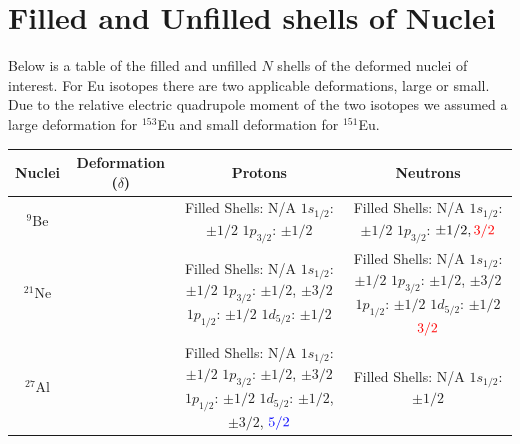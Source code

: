 \documentclass[8pt,a4paper, twoside]{report}
\begin{document}
\section{Filled and Unfilled shells of Nuclei}
Below is a table of the filled and unfilled $N$ shells of the deformed nuclei of interest. For Eu isotopes there are two applicable deformations, large or small. Due to the relative electric quadrupole moment of the two isotopes we assumed a large deformation for $^{153}$Eu and small deformation for $^{151}$Eu.
\begin{table}[htbp]
\begin{adjustwidth}{-3cm}{-3cm}
\center
\begin{tabular}{|c|c|c|c|}
\toprule
\toprule
Nuclei     & Deformation ($\delta$) & Protons & Neutrons \\
\midrule
$^{9}$Be   &                        
    &  \pbox{20cm}{Filled Shells: N/A \\
    $1s_{1/2}$: $\pm 1/2$ \\
    $1p_{3/2}$: $\pm 1/2$}              
    &  \pbox{20cm}{Filled Shells: N/A \\
    $1s_{1/2}$: $\pm 1/2$ \\
    $1p_{3/2}$: $\pm 1/2, \textcolor{red}{3/2}$}\\
\midrule
$^{21}$Ne  &       
    &  \pbox{20cm}{Filled Shells: N/A \\
    $1s_{1/2}$: $\pm 1/2$ \\
    $1p_{3/2}$: $\pm 1/2$, $\pm 3/2$ \\
    $1p_{1/2}$: $\pm 1/2$ \\
    $1d_{5/2}$: $\pm 1/2$}              
    &  \pbox{20cm}{Filled Shells: N/A \\
    $1s_{1/2}$: $\pm 1/2$ \\
    $1p_{3/2}$: $\pm 1/2$, $\pm 3/2$ \\
    $1p_{1/2}$: $\pm 1/2$ \\
    $1d_{5/2}$: $\pm 1/2$ $\textcolor{red}{3/2}$}\\
\midrule
$^{27}$Al  &       
    &  \pbox{20cm}{Filled Shells: N/A \\
    $1s_{1/2}$: $\pm 1/2$ \\
    $1p_{3/2}$: $\pm 1/2$, $\pm 3/2$ \\
    $1p_{1/2}$: $\pm 1/2$ \\
    $1d_{5/2}$: $\pm 1/2$, $\pm 3/2$, $\textcolor{blue}{5/2}$}              
    &  \pbox{20cm}{Filled Shells: N/A \\
    $1s_{1/2}$: $\pm 1/2$ \\
}
\end{tabular}
\end{adjustwidth}
\end{table}
\end{document}

